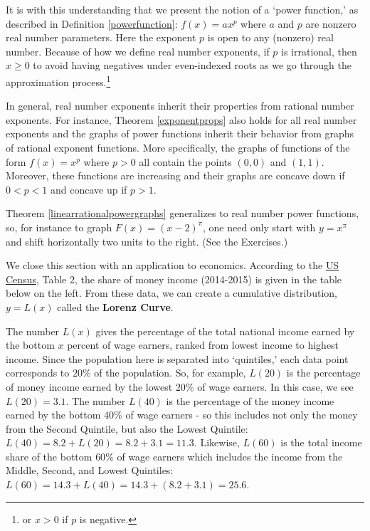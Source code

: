 \documentclass{ximera}
\begin{document}
It is with this understanding that we present the notion of a `power function,' as described in Definition   \ref{powerfunction}:  $f(x) = a x^p$ where $a$ and $p$ are nonzero real number parameters.  Here the exponent $p$ is open to any (nonzero) real number.  Because of how we define real number exponents, if $p$ is irrational, then $ x \geq 0$ to avoid having negatives under even-indexed roots as we go through the approximation process.\footnote{or $x > 0$ if $p$ is negative.} 

In general, real number exponents inherit their properties from rational number exponents.  For instance, Theorem \ref{exponentprops} also holds for all real number exponents and the graphs of power functions inherit their behavior from graphs of rational exponent functions.  More specifically, the graphs of functions of the form $f(x)= x^p$ where $p>0$ all contain the points $(0,0)$ and $(1,1)$.  Moreover, these functions are increasing and their graphs are  concave down if $0<p<1$ and concave up if $p>1$. 

\begin{center}
\end{center}

Theorem \ref{linearrationalpowergraphs}  generalizes to real number power functions, so, for instance to graph $F(x) = (x-2)^{\pi}$, one need only start with $y = x^{\pi}$ and shift horizontally two units to the right.  (See the Exercises.)  

We close this section with an application to economics.  According to the \href{http://www.census.gov/library/publications/2016/demo/p60-256.html }{\underline{US Census}}, Table 2, the share of money income (2014-2015) is given in the table below on the left. From these data, we can create a cumulative distribution, $y = L(x)$ called the \textbf{Lorenz Curve}.   

The number $L(x)$ gives the percentage of the total national income earned by the bottom $x$ percent of wage earners, ranked from lowest income to highest income.  Since the population here is separated into `quintiles,' each data point corresponds to $20 \%$ of the population.  So, for example, $L(20)$ is the percentage of money income earned by the lowest $20 \%$ of wage earners.  In this case, we see $L(20) = 3.1$.  The number  $L(40)$ is the percentage of the money income earned by the bottom $40 \%$ of wage earners - so this includes not only the money from the Second Quintile, but also the Lowest Quintile:  $L(40) = 8.2 + L(20) = 8.2 +  3.1 = 11.3$.  Likewise, $L(60)$ is the total income share of the bottom $60 \%$ of wage earners which includes the income from the Middle, Second, and Lowest Quintiles:  $L(60) = 14.3 + L(40) = 14.3 + (8.2+3.1) = 25.6$.  
\end{document}
